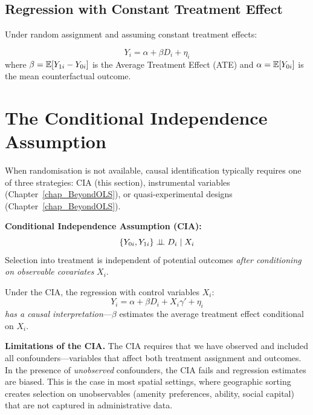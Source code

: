 \subsection{Regression with Constant Treatment Effect}

Under random assignment and assuming constant treatment effects:

\begin{tcolorbox}[keyresult]
\begin{equation}
  Y_i = \alpha + \beta D_i + \eta_i
  \label{eq_TreatmentReg}
\end{equation}
where $\beta = \mathbb{E}[Y_{1i} - Y_{0i}]$ is the Average Treatment Effect (ATE)
and $\alpha = \mathbb{E}[Y_{0i}]$ is the mean counterfactual outcome.
\end{tcolorbox}


\section{The Conditional Independence Assumption}
\label{sec_CIA}

When randomisation is not available, causal identification typically requires
one of three strategies: CIA (this section), instrumental variables
(Chapter~\ref{chap_BeyondOLS}), or quasi-experimental designs
(Chapter~\ref{chap_BeyondOLS}).

\begin{tcolorbox}[keyresult]
\textbf{Conditional Independence Assumption (CIA):}
\begin{equation}
  \{Y_{0i}, Y_{1i}\} \perp\!\!\!\perp D_i \mid X_i
  \label{eq_CIA}
\end{equation}
Selection into treatment is independent of potential outcomes \emph{after
conditioning on observable covariates} $X_i$.
\end{tcolorbox}

Under the CIA, the regression with control variables $X_i$:
\begin{equation}
  Y_i = \alpha + \beta D_i + X_i\gamma' + \eta_i
\end{equation}
\emph{has a causal interpretation}---$\beta$ estimates the average treatment
effect conditional on $X_i$.

\noindent\textbf{Limitations of the CIA.} The CIA requires that we have
observed and included all confounders---variables that affect both treatment
assignment and outcomes. In the presence of \emph{unobserved} confounders,
the CIA fails and regression estimates are biased. This is the case in most
spatial settings, where geographic sorting creates selection on unobservables
(amenity preferences, ability, social capital) that are not captured in
administrative data.


